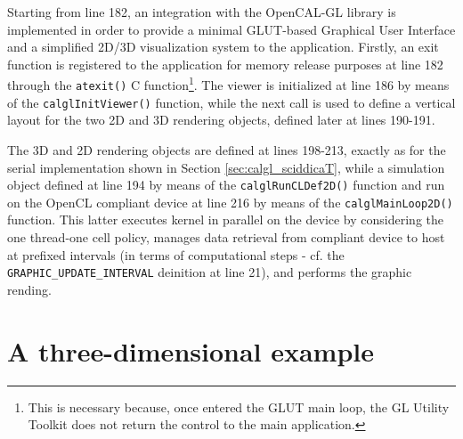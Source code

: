 Starting from line 182, an integration with the OpenCAL-GL library is
implemented in order to provide a minimal GLUT-based Graphical User
Interface and a simplified 2D/3D visualization system to the
application. Firstly, an exit function is registered to the
application for memory release purposes at line 182 through the
\verb'atexit()' C function\footnote{This is necessary because, once
  entered the GLUT main loop, the GL Utility Toolkit does not return
  the control to the main application.}. The viewer is initialized at
line 186 by means of the \verb'calglInitViewer()' function, while the
next call is used to define a vertical layout for the two 2D and 3D
rendering objects, defined later at lines 190-191.

The 3D and 2D rendering objects are defined at lines 198-213, exactly
as for the serial implementation shown in Section
\ref{sec:calgl_sciddicaT}, while a simulation object defined at line
194 by means of the \verb'calglRunCLDef2D()' function and run on the
OpenCL compliant device at line 216 by means of the
\verb'calglMainLoop2D()' function. This latter executes kernel in
parallel on the device by considering the one thread-one cell policy,
manages data retrieval from compliant device to host at prefixed
intervals (in terms of computational steps - cf. the
\verb'GRAPHIC_UPDATE_INTERVAL' deinition at line 21), and performs the
graphic rending.


\section{A three-dimensional example}



